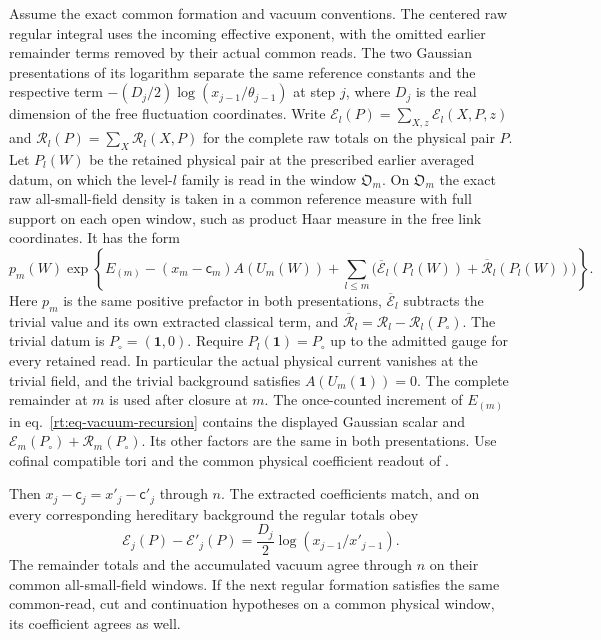 \documentclass[11pt,letterpaper,reqno]{amsart}
\makeatletter
\numberwithin{equation}{section}
\renewcommand{\eqref}[1]{\textup{eq.~\ref{#1}}}
\theoremstyle{definition}
\newcommand{\ms@minorstart}{%
  \pushQED{\qed}\renewcommand{\qedsymbol}{$\blacksquare$}}
\newenvironment{proposition}[1][]{\ms@minorstart\ms@proposition[#1]}
  {\popQED\endms@proposition}
\theoremstyle{remark}
\makeatother
\begin{document}
\begin{proposition}[Matching on common all-small-field windows]
Assume the exact common formation and vacuum conventions. The
centered raw regular integral uses the incoming effective exponent,
with the omitted earlier remainder terms removed by their actual
common reads. The two Gaussian presentations of its logarithm
separate the same reference constants and the respective term
$-(D_j/2)\log(x_{j-1}/\theta_{j-1})$ at step $j$, where $D_j$ is
the real dimension of the free fluctuation coordinates. Write
$\mathscr E_l(P)=\sum_{X,z}\mathcal E_l(X,P,z)$ and
$\mathscr R_l(P)=\sum_X\mathcal R_l(X,P)$ for the complete raw totals
on the physical pair $P$. Let $P_l(W)$ be the retained physical pair
at the prescribed earlier averaged datum, on which the level-$l$
family is read in the window $\mathfrak O_m$.
On $\mathfrak O_m$ the exact
raw all-small-field density is taken in a common reference measure
with full support on each open window, such as product Haar
measure in the free link coordinates. It has the form
\begin{equation}\label{rt:eq-matching-density}
  p_m(W)\exp\left\{E_{(m)}-(x_m-\mathsf c_m) A(U_m(W))
      +\sum_{l\le m}\bigl(\overline{\mathscr E}_l(P_l(W))
                       +\overline{\mathscr R}_l(P_l(W))\bigr)\right\}.
\end{equation}
Here $p_m$ is the same positive prefactor in both presentations,
$\overline{\mathscr E}_l$ subtracts the trivial value and its own
extracted classical term, and
$\overline{\mathscr R}_l=\mathscr R_l-\mathscr R_l(P_\circ)$.
The trivial datum is $P_\circ=(\mathbf1,0)$. Require
$P_l(\mathbf1)=P_\circ$ up to the admitted gauge for every retained
read. In particular the actual physical current vanishes at the
trivial field, and the trivial background satisfies $A(U_m(\mathbf1))=0$.
The complete remainder at $m$ is used after closure at $m$.
The once-counted increment of $E_{(m)}$ in
\eqref{rt:eq-vacuum-recursion} contains the displayed Gaussian
scalar and $\mathscr E_m(P_\circ)+\mathscr R_m(P_\circ)$.
Its other factors are the same in both presentations. Use cofinal
compatible tori and the common physical coefficient readout of
\cite[Proposition~6.3]{EM}.

Then $x_j-\mathsf c_j=x'_j-\mathsf c'_j$ through $n$. The extracted coefficients
match, and on every corresponding hereditary background the
regular totals obey
\begin{equation}\label{rt:eq-regular-presentation-constant}
  \mathscr E_j(P)-\mathscr E'_j(P)
            =\frac{D_j}{2}\log(x_{j-1}/x'_{j-1}).
\end{equation}
The remainder totals and the accumulated vacuum agree through $n$
on their common all-small-field windows. If the next regular formation
satisfies the same common-read, cut and continuation hypotheses on
a common physical window, its coefficient agrees as well.
\end{proposition}
\end{document}
